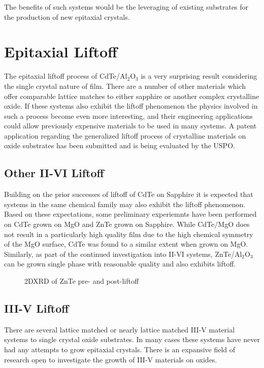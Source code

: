 The benefits of such systems would be the leveraging of existing substrates for the production of new epitaxial crystals.

\section{Epitaxial Liftoff}
The epitaxial liftoff process of CdTe/Al$_2$O$_3$ is a very surprising result considering the single crystal nature of film. There are a number of other materials which offer comparable lattice matches to either sapphire or another complex crystalline oxide. If these systems also exhibit the liftoff phenomenon the physics involved in such a process become even more interesting, and their engineering applications could allow previously expensive materials to be used in many systems. A patent application regarding the generalized liftoff process of crystalline materials on oxide substrates has been submitted and is being evaluated by the USPO.

\subsection{Other II-VI Liftoff}
Building on the prior successes of liftoff of CdTe on Sapphire it is expected that systems in the same chemical family may also exhibit the liftoff phenomenon. Based on these expectations, some preliminary experiemnts have been performed on CdTe grown on MgO and ZnTe grown on Sapphire. While CdTe/MgO does not result in a particularly high quality film due to the high chemical symmetry of the MgO surface, CdTe was found to a similar extent when grown on MgO. Similarly, as part of the continued investigation into II-VI systems, ZnTe/Al$_2$O$_3$ can be grown single phase with reasonable quality and also exhibits liftoff.
\begin{figure}
    \caption{\label{fig:future_znte_liftoff}2DXRD of ZnTe pre- and post-liftoff}
\end{figure}

\subsection{III-V Liftoff}
There are several lattice matched or nearly lattice matched III-V material systems to single crystal oxide substrates. In many cases these systems have never had any attempts to grow epitaxial crystals. There is an expansive field of research open to investigate the growth of III-V materials on oxides.

